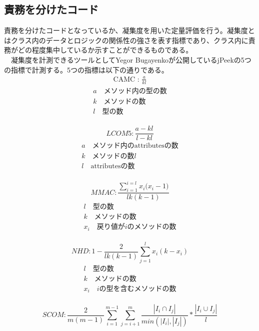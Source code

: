 \documentclass[12pt, a4paper]{jreport}
\begin{document}
\subsection{責務を分けたコード}
責務を分けたコードとなっているか、凝集度を用いた定量評価を行う。凝集度とはクラス内のデータとロジックの関係性の強さを表す指標であり、クラス内に責務がどの程度集中しているか示すことができるものである。
\\　凝集度を計測できるツールとしてYegor Bugayenkoが公開しているjPeekの5つの指標で計測する。5つの指標は以下の通りである。
\\
\begin{gather}
\text{CAMC : }
\frac{a}{kl}
\end{gather}
\begin{gather*}
a\text{　メソッド内の型の数}
\\k\text{　メソッドの数}
\\l\text{　型の数}
\end{gather*}
\\
\begin{equation}
LCOM5:
\frac{a-kl}{l-kl}
\end{equation}
\begin{gather*}
a\text{　メソッド内のattributesの数}
\\k\text{　メソッドの数}
l\\l\text{　attributesの数}
\end{gather*}
\\
\begin{equation}
MMAC:
\frac{\sum^{i=l}_{i=1}{{x}_{i}{({x}_{i}-1})}}{lk(k-1)}
\end{equation}
\begin{gather*}
l\text{　型の数}
\\k\text{　メソッドの数}
\\{x}_{i}\text{　戻り値が}i\text{のメソッドの数}
\end{gather*}
\\
\begin{equation}
NHD:
1-\frac{2}{lk(k-1)}\sum^{l}_{j=1}{x}_{i}{(k-{x}_{i})}
\end{equation}
\begin{gather*}
l\text{　型の数}
\\k\text{　メソッドの数}
\\{x}_{i}\text{　}i\text{の型を含むメソッドの数}
\end{gather*}
\\
\begin{equation}
SCOM:
\frac{2}{m(m-1)}\sum^{m-1}_{i=1}\sum^{m}_{j=i+1}\frac{|{I}_{i}\cap{I}_{j}|}{min(|{I}_{i}|,|{I}_{j}|)}*\frac{|{I}_{i}\cup{I}_{j}|}{l}
\end{equation}
\end{document}
